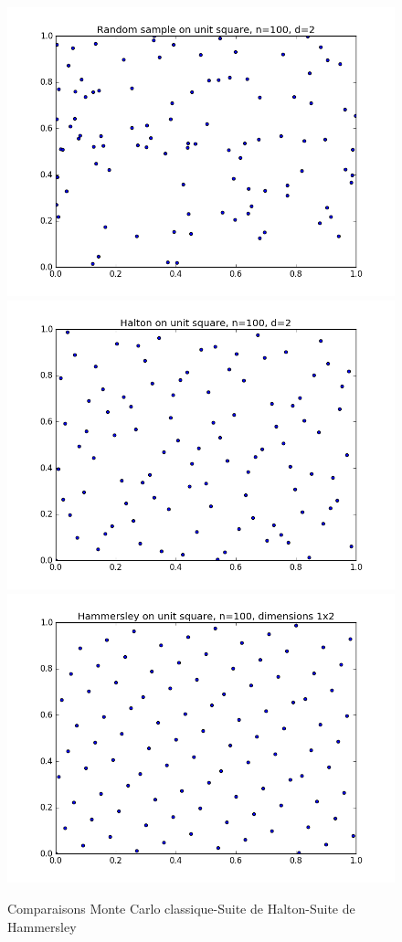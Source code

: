 \documentclass[12pt]{report}
\begin{document}
\begin{figure}[h]
	\centering
	\includegraphics[scale=0.4]{figure_2-halton-random-sample.png}
	\includegraphics[scale=0.4]{figure_2-halton-halton.png}
	\includegraphics[scale=0.4]{figure_3-hammersley.png}
	\caption{Comparaisons Monte Carlo classique-Suite de Halton-Suite de Hammersley}	
\end{figure}
\end{document}
